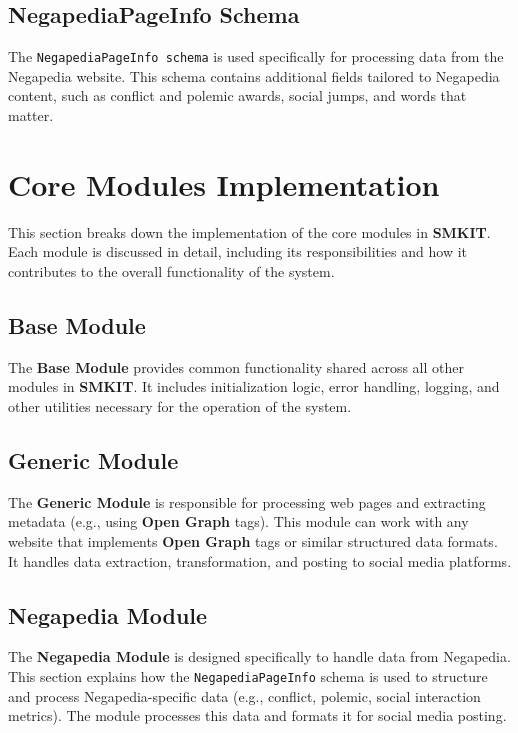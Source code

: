 \subsection{NegapediaPageInfo Schema}
\label{subsec:negapediapageinfo_schema}
The \texttt{NegapediaPageInfo schema} is used specifically for processing data from the Negapedia website. This schema contains additional fields tailored to Negapedia content, such as conflict and polemic awards, social jumps, and words that matter.

\section{Core Modules Implementation}
\label{sec:core_modules_implementation}
This section breaks down the implementation of the core modules in \textbf{SMKIT}. Each module is discussed in detail, including its responsibilities and how it contributes to the overall functionality of the system.

\subsection{Base Module}
\label{subsec:base_module}
The \textbf{Base Module} provides common functionality shared across all other modules in \textbf{SMKIT}. It includes initialization logic, error handling, logging, and other utilities necessary for the operation of the system.

\subsection{Generic Module}
\label{subsec:generic_module}
The \textbf{Generic Module} is responsible for processing web pages and extracting metadata (e.g., using \textbf{Open Graph} tags). This module can work with any website that implements \textbf{Open Graph} tags or similar structured data formats. It handles data extraction, transformation, and posting to social media platforms.

\subsection{Negapedia Module}
\label{subsec:negapedia_module}
The \textbf{Negapedia Module} is designed specifically to handle data from Negapedia. This section explains how the \texttt{NegapediaPageInfo} schema is used to structure and process Negapedia-specific data (e.g., conflict, polemic, social interaction metrics). The module processes this data and formats it for social media posting.

